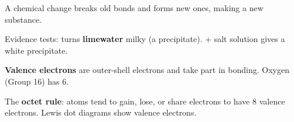 \begin{gradebody}
\kf
\begin{keyfacts}
\item A chemical change breaks old bonds and forms new ones, making a new substance.
\item Evidence tests:  turns \textbf{limewater} milky (a  precipitate).  + salt solution gives a white  precipitate.
\item \textbf{Valence electrons} are outer-shell electrons and take part in bonding. Oxygen (Group 16) has 6.
\item The \textbf{octet rule}: atoms tend to gain, lose, or share electrons to have 8 valence electrons. Lewis dot diagrams show valence electrons.
\end{keyfacts}
\cards
{}


\end{gradebody}
